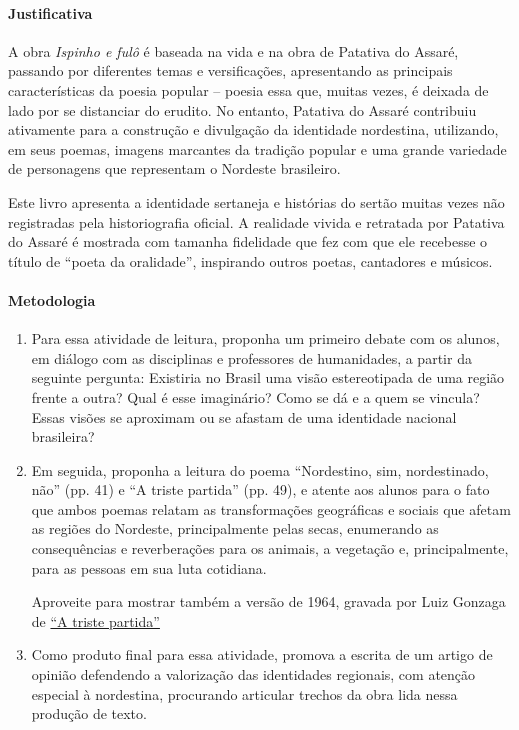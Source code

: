 \documentclass[12pt]{extarticle}
\begin{document}
{\paragraph{Justificativa} A obra \emph{Ispinho e fulô} é baseada na vida 
e na obra de Patativa do Assaré, passando por diferentes temas e 
versificações, apresentando as principais características da poesia 
popular -- poesia essa que, muitas vezes, é deixada de lado por se 
distanciar do erudito.
No entanto, Patativa do Assaré contribuiu ativamente para a construção e
divulgação da identidade nordestina, utilizando, em seus poemas, imagens
marcantes da tradição popular e uma grande variedade de personagens que
representam o Nordeste brasileiro.

Este livro apresenta a identidade sertaneja e histórias do sertão muitas
vezes não registradas pela historiografia oficial. A realidade vivida e
retratada por Patativa do Assaré é mostrada com tamanha fidelidade que
fez com que ele recebesse o título de ``poeta da oralidade'', inspirando
outros poetas, cantadores e músicos.

\paragraph{Metodologia}

\begin{enumerate}
\item
Para essa atividade de leitura, proponha um primeiro debate com os alunos,
em diálogo com as disciplinas e professores de humanidades, a partir da 
seguinte pergunta: 
Existiria no Brasil uma visão estereotipada de uma região frente a outra? 
Qual é esse imaginário? Como se dá e a quem se vincula? Essas visões se 
aproximam ou se afastam de uma identidade nacional brasileira?

\item
Em seguida, proponha a leitura do poema ``Nordestino, sim, nordestinado, 
não'' (pp. 41) e ``A triste partida'' (pp. 49), e atente aos alunos para 
o fato que ambos poemas relatam as transformações geográficas e sociais 
que afetam as regiões do Nordeste, principalmente pelas secas, enumerando 
as consequências e reverberações para os animais, a vegetação e, 
principalmente, para as pessoas em sua luta cotidiana. 

Aproveite para mostrar também a versão de 1964, gravada por Luiz Gonzaga 
de \href{https://www.youtube.com/watch?v=Yu0bvuK8s_k&ab_channel=EllisStoffel}{``A triste partida''}

\item
Como produto final para essa atividade, promova a escrita de um artigo de 
opinião defendendo a valorização das identidades regionais, com atenção 
especial à nordestina, procurando articular trechos da obra lida nessa 
produção de texto. 


\end{enumerate}}
\end{document}
